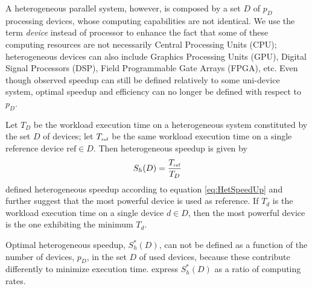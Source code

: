 A heterogeneous parallel system, however, is composed by a set $D$ of $p_D$ processing devices, whose computing capabilities are not identical. We use the term {\em device} instead of processor to enhance the fact that some of these computing resources are not necessarily Central Processing Units (CPU); heterogeneous devices can also include Graphics Processing Units (GPU), Digital Signal Processors (DSP), Field Programmable Gate Arrays (FPGA), etc. Even though observed speedup can still be defined relatively to some uni-device system, optimal speedup and efficiency can no longer be defined with respect to $p_D$.

Let $T_D$ be the workload execution time on a heterogeneous system constituted by the set $D$ of devices; let $T_{\mbox{\tiny ref}}$ be the same workload execution time on a single reference device $\mbox{ref} \in D$. Then heterogeneous speedup is given by
\begin{equation}
S_h(D) = \frac{T_{\mbox{\tiny ref}}}{T_D}
\label{eq:HetSpeedUp}
\end{equation}
\cite{Chamberlain98} defined heterogeneous speedup according to equation \ref{eq:HetSpeedUp} and further suggest that the most powerful device is used as reference. If $T_d$ is the workload execution time on a single device $d \in D$, then the most powerful device is the one exhibiting the minimum $T_d$.

Optimal heterogeneous speedup, $S_h^*(D)$, can not be defined as a function of the number of devices, $p_D$, in the set $D$ of used devices, because these contribute differently to minimize execution time. \cite{Chamberlain98} express $S_h^*(D)$ as a ratio of computing rates. 

